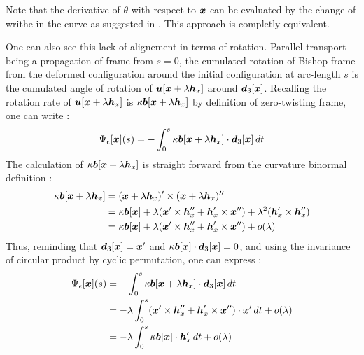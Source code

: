 Note that the derivative of $\theta$ with respect to $\boldsymbol{x}$ can be evaluated by the change of writhe in the curve as suggested in \cite{deVries2005}. This approach is completly equivalent.

One can also see this lack of alignement in terms of rotation. Parallel transport being a propagation of frame from $s = 0$, the cumulated rotation of Bishop frame from the deformed configuration around the initial configuration at arc-length $s$ is the cumulated angle of rotation of $\boldsymbol{u}[\boldsymbol{x} + \lambda\boldsymbol{h}_x]$ around $\boldsymbol{d}_3[\boldsymbol{x}]$. Recalling the rotation rate of $\boldsymbol{u}[\boldsymbol{x} + \lambda\boldsymbol{h}_x]$ is $\kappa\boldsymbol{b}[\boldsymbol{x} + \lambda\boldsymbol{h}_x]$ by definition of zero-twisting frame, one can write :
\begin{equation}
	\Psi_\epsilon[\boldsymbol{x}](s) =
	-\int_0^s \kappa\boldsymbol{b}[\boldsymbol{x} + \lambda\boldsymbol{h}_x] \cdot \boldsymbol{d}_3[\boldsymbol{x}] \,dt
\end{equation}
The calculation of $\kappa\boldsymbol{b}[\boldsymbol{x} + \lambda\boldsymbol{h}_x]$ is straight forward from the curvature binormal definition :
\begin{equation}
	\begin{aligned}
	\kappa\boldsymbol{b}[\boldsymbol{x} + \lambda\boldsymbol{h}_x]
	&= (\boldsymbol{x} + \lambda\boldsymbol{h}_x)' \times (\boldsymbol{x} + \lambda\boldsymbol{h}_x)'' \\
	&= \kappa\boldsymbol{b}[\boldsymbol{x}] + \lambda(\boldsymbol{x}'\times\boldsymbol{h}''_x + \boldsymbol{h}'_x\times\boldsymbol{x}'') + \lambda^2(\boldsymbol{h}'_x \times \boldsymbol{h}''_x) \\
	&= \kappa\boldsymbol{b}[\boldsymbol{x}] + \lambda(\boldsymbol{x}'\times\boldsymbol{h}''_x + \boldsymbol{h}'_x\times\boldsymbol{x}'') + o(\lambda)
	\end{aligned}
\end{equation}
Thus, reminding that $\boldsymbol{d}_3[\boldsymbol{x}] = \boldsymbol{x}'$ and $\kappa\boldsymbol{b}[\boldsymbol{x}]\cdot\boldsymbol{d}_3[\boldsymbol{x}] = 0$, and using the invariance of circular product by cyclic permutation, one can express :
\begin{equation}
	\begin{aligned}
		\Psi_\epsilon[\boldsymbol{x}](s) 
		&= -\int_0^s \kappa\boldsymbol{b}[\boldsymbol{x} + \lambda\boldsymbol{h}_x] \cdot \boldsymbol{d}_3[\boldsymbol{x}] \,dt\\
		&= - \lambda \int_0^s (\boldsymbol{x}'\times\boldsymbol{h}''_x + \boldsymbol{h}'_x\times\boldsymbol{x}'') \cdot \boldsymbol{x}' \,dt + o(\lambda)\\
		&= - \lambda \int_0^s \kappa\boldsymbol{b}[\boldsymbol{x}]\cdot\boldsymbol{h}'_x \,dt + o(\lambda)\\
	\end{aligned}
\end{equation}
